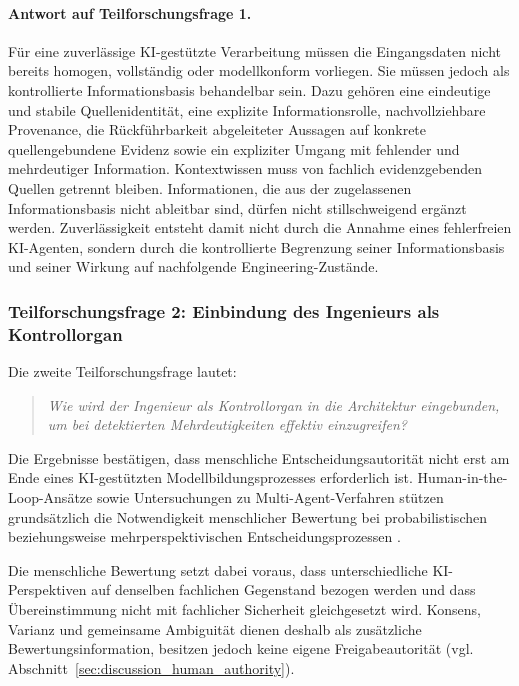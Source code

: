 \paragraph{Antwort auf Teilforschungsfrage 1.}

Für eine zuverlässige KI-gestützte Verarbeitung müssen die Eingangsdaten
nicht bereits homogen, vollständig oder modellkonform vorliegen. Sie müssen
jedoch als kontrollierte Informationsbasis behandelbar sein. Dazu gehören
eine eindeutige und stabile Quellenidentität, eine explizite
Informationsrolle, nachvollziehbare Provenance, die Rückführbarkeit
abgeleiteter Aussagen auf konkrete quellengebundene Evidenz sowie ein
expliziter Umgang mit fehlender und mehrdeutiger Information. Kontextwissen
muss von fachlich evidenzgebenden Quellen getrennt bleiben. Informationen,
die aus der zugelassenen Informationsbasis nicht ableitbar sind, dürfen nicht
stillschweigend ergänzt werden. Zuverlässigkeit entsteht damit nicht durch
die Annahme eines fehlerfreien KI-Agenten, sondern durch die kontrollierte
Begrenzung seiner Informationsbasis und seiner Wirkung auf nachfolgende
Engineering-Zustände.

\subsubsection{Teilforschungsfrage 2: Einbindung des Ingenieurs als Kontrollorgan}
\label{sec:discussion_rq2}

Die zweite Teilforschungsfrage lautet:

\begin{quote}
\textit{Wie wird der Ingenieur als Kontrollorgan in die Architektur eingebunden,
um bei detektierten Mehrdeutigkeiten effektiv einzugreifen?}
\end{quote}

Die Ergebnisse bestätigen, dass menschliche Entscheidungsautorität nicht erst
am Ende eines KI-gestützten Modellbildungsprozesses erforderlich ist.
Human-in-the-Loop-Ansätze sowie Untersuchungen zu Multi-Agent-Verfahren
stützen grundsätzlich die Notwendigkeit menschlicher Bewertung bei
probabilistischen beziehungsweise mehrperspektivischen
Entscheidungsprozessen
\cite{MosqueiraRey2023,Lazaros2026,TriemDing2024}.

Die menschliche Bewertung setzt dabei voraus, dass unterschiedliche
KI-Perspektiven auf denselben fachlichen Gegenstand bezogen werden und dass
Übereinstimmung nicht mit fachlicher Sicherheit gleichgesetzt wird. Konsens,
Varianz und gemeinsame Ambiguität dienen deshalb als zusätzliche
Bewertungsinformation, besitzen jedoch keine eigene Freigabeautorität
(vgl. Abschnitt~\ref{sec:discussion_human_authority}).


